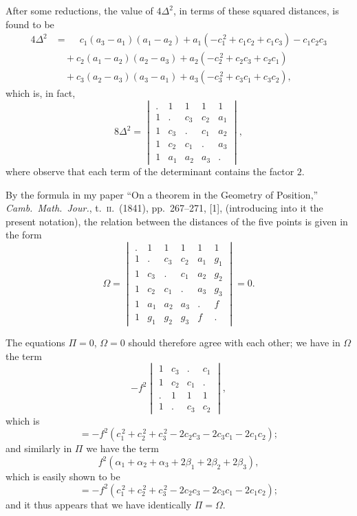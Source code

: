 \documentclass[11pt,a4paper]{article}
\theoremstyle{plain}
\theoremstyle{definition}
\begin{document}
After some reductions, the value of $4\Delta^2$, in terms of these squared distances, is found to be
\begin{align*}
4\Delta^2 &= \phantom{+} c_1(a_3 - a_1)(a_1 - a_2) + a_1(-c_1^{\,2} + c_1 c_2 + c_1 c_3) - c_1 c_2 c_3 \\
&\quad + c_2(a_1 - a_2)(a_2 - a_3) + a_2(-c_2^{\,2} + c_2 c_3 + c_2 c_1) \\
&\quad + c_3(a_2 - a_3)(a_3 - a_1) + a_3(-c_3^{\,2} + c_3 c_1 + c_3 c_2),
\end{align*}
which is, in fact,
\[
8\Delta^2 = \begin{vmatrix}
. & 1 & 1 & 1 & 1 \\
1 & . & c_3 & c_2 & a_1 \\
1 & c_3 & . & c_1 & a_2 \\
1 & c_2 & c_1 & . & a_3 \\
1 & a_1 & a_2 & a_3 & .
\end{vmatrix},
\]
where observe that each term of the determinant contains the factor $2$.

By the formula in my paper ``On a theorem in the Geometry of Position,'' \textit{Camb.\ Math.\ Jour.}, t.\ \textsc{ii}.\ (1841), pp.\ 267--271, [1], (introducing into it the present notation), the relation between the distances of the five points is given in the form
\[
\Omega = \begin{vmatrix}
. & 1 & 1 & 1 & 1 & 1 \\
1 & . & c_3 & c_2 & a_1 & g_1 \\
1 & c_3 & . & c_1 & a_2 & g_2 \\
1 & c_2 & c_1 & . & a_3 & g_3 \\
1 & a_1 & a_2 & a_3 & . & f \\
1 & g_1 & g_2 & g_3 & f & .
\end{vmatrix} = 0.
\]

The equations $\Pi = 0$, $\Omega = 0$ should therefore agree with each other; we have in $\Omega$ the term
\[
-f^2 \begin{vmatrix}
1 & c_3 & . & c_1 \\
1 & c_2 & c_1 & . \\
. & 1 & 1 & 1 \\
1 & . & c_3 & c_2
\end{vmatrix},
\]
which is
\[ = -f^2(c_1^{\,2} + c_2^{\,2} + c_3^{\,2} - 2c_2 c_3 - 2c_3 c_1 - 2c_1 c_2); \]
and similarly in $\Pi$ we have the term
\[ f^2(\alpha_1 + \alpha_2 + \alpha_3 + 2\beta_1 + 2\beta_2 + 2\beta_3), \]
which is easily shown to be
\[ = -f^2(c_1^{\,2} + c_2^{\,2} + c_3^{\,2} - 2c_2 c_3 - 2c_3 c_1 - 2c_1 c_2); \]
and it thus appears that we have identically $\Pi = \Omega$.
\end{document}
